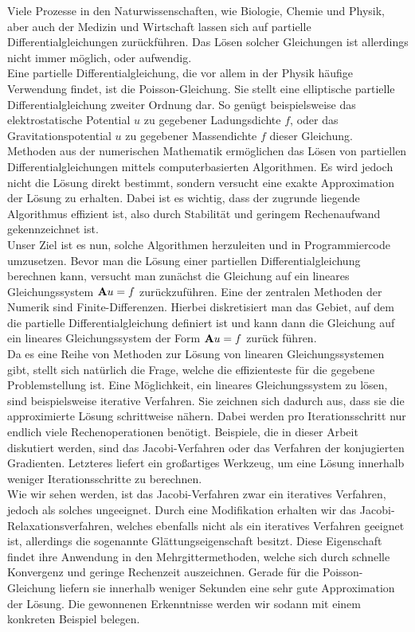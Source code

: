 Viele Prozesse in den Naturwissenschaften, wie Biologie, Chemie und Physik, aber auch der Medizin und Wirtschaft lassen sich auf partielle Differentialgleichungen zurückführen. Das Lösen solcher Gleichungen ist allerdings nicht immer möglich, oder aufwendig. \\
Eine partielle Differentialgleichung, die vor allem in der Physik häufige Verwendung findet, ist die Poisson-Gleichung. Sie stellt eine elliptische partielle Differentialgleichung zweiter Ordnung dar. So genügt beispielsweise das elektrostatische Potential $u$ zu gegebener Ladungsdichte $f$, oder das Gravitationspotential $u$ zu gegebener Massendichte $f$ dieser Gleichung. \\
Methoden aus der numerischen Mathematik ermöglichen das Lösen von partiellen Differentialgleichungen mittels computerbasierten Algorithmen. Es wird jedoch nicht die Lösung direkt bestimmt, sondern versucht eine exakte Approximation der Lösung zu erhalten. Dabei ist es wichtig, dass der zugrunde liegende Algorithmus effizient ist, also durch Stabilität und geringem Rechenaufwand gekennzeichnet ist. \\
Unser Ziel ist es nun, solche Algorithmen herzuleiten und in Programmiercode umzusetzen. Bevor man die Lösung einer partiellen Differentialgleichung berechnen kann, versucht man zunächst die Gleichung auf ein lineares Gleichungssystem ${\textbf{A}} u = f$ zurückzuführen. Eine der zentralen Methoden der Numerik sind Finite-Differenzen. Hierbei diskretisiert man das Gebiet, auf dem die partielle Differentialgleichung definiert ist und kann dann die Gleichung auf ein lineares Gleichungssystem der Form ${\textbf{A}} u = f$ zurück führen. \\
Da es eine Reihe von Methoden zur Lösung von linearen Gleichungssystemen gibt, stellt sich natürlich die Frage, welche die effizienteste für die gegebene Problemstellung ist. Eine Möglichkeit, ein lineares Gleichungssystem zu lösen, sind beispielsweise iterative Verfahren. Sie zeichnen sich dadurch aus, dass sie die approximierte Lösung schrittweise nähern. Dabei werden pro Iterationsschritt nur endlich viele Rechenoperationen benötigt. Beispiele, die in dieser Arbeit diskutiert werden, sind das Jacobi-Verfahren oder das Verfahren der konjugierten Gradienten. Letzteres liefert ein großartiges Werkzeug, um eine Lösung innerhalb weniger Iterationsschritte zu berechnen. \\
Wie wir sehen werden, ist das Jacobi-Verfahren zwar ein iteratives Verfahren, jedoch als solches ungeeignet. Durch eine Modifikation erhalten wir das Jacobi-Relaxationsverfahren, welches ebenfalls nicht als ein iteratives Verfahren geeignet ist, allerdings die sogenannte Glättungseigenschaft besitzt. Diese Eigenschaft findet ihre Anwendung in den Mehrgittermethoden, welche sich durch schnelle Konvergenz und geringe Rechenzeit auszeichnen. Gerade für die Poisson-Gleichung liefern sie innerhalb weniger Sekunden eine sehr gute Approximation der Lösung. Die gewonnenen Erkenntnisse werden wir sodann mit einem konkreten Beispiel belegen.


